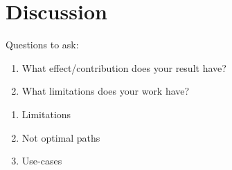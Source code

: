 \chapter{Discussion}
\label{sec:discussion}
Questions to ask:
\begin{enumerate}
    \item What effect/contribution does your result have?
    \item What limitations does your work have?
\end{enumerate}

\begin{enumerate}
    \item Limitations
    \item Not optimal paths
    \item Use-cases
\end{enumerate}